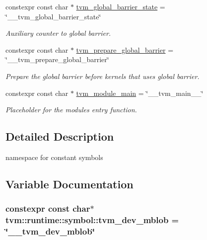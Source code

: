 \begin{DoxyCompactItemize}
constexpr const char $\ast$ \hyperlink{namespacetvm_1_1runtime_1_1symbol_ac21d436bd65464b49858ba4bc55fb3ec}{tvm\+\_\+global\+\_\+barrier\+\_\+state} = \char`\"{}\+\_\+\+\_\+tvm\+\_\+global\+\_\+barrier\+\_\+state\char`\"{}
\begin{DoxyCompactList}\small\item\em Auxiliary counter to global barrier. \end{DoxyCompactList}\item 
constexpr const char $\ast$ \hyperlink{namespacetvm_1_1runtime_1_1symbol_af4a5fe87c6e95d6b082a2be1960efbe5}{tvm\+\_\+prepare\+\_\+global\+\_\+barrier} = \char`\"{}\+\_\+\+\_\+tvm\+\_\+prepare\+\_\+global\+\_\+barrier\char`\"{}
\begin{DoxyCompactList}\small\item\em Prepare the global barrier before kernels that uses global barrier. \end{DoxyCompactList}\item 
constexpr const char $\ast$ \hyperlink{namespacetvm_1_1runtime_1_1symbol_abfc81fd15b5d8087b956a8cef4152bf4}{tvm\+\_\+module\+\_\+main} = \char`\"{}\+\_\+\+\_\+tvm\+\_\+main\+\_\+\+\_\+\char`\"{}
\begin{DoxyCompactList}\small\item\em Placeholder for the module\textquotesingle{}s entry function. \end{DoxyCompactList}\end{DoxyCompactItemize}


\subsection{Detailed Description}
namespace for constant symbols 

\subsection{Variable Documentation}
\subsubsection[{\texorpdfstring{tvm\+\_\+dev\+\_\+mblob}{tvm_dev_mblob}}]{\setlength{\rightskip}{0pt plus 5cm}constexpr const char$\ast$ tvm\+::runtime\+::symbol\+::tvm\+\_\+dev\+\_\+mblob = \char`\"{}\+\_\+\+\_\+tvm\+\_\+dev\+\_\+mblob\char`\"{}}\hypertarget{namespacetvm_1_1runtime_1_1symbol_a316b327224938ffb2a73a9c4432d1da9}{}\label{namespacetvm_1_1runtime_1_1symbol_a316b327224938ffb2a73a9c4432d1da9}


